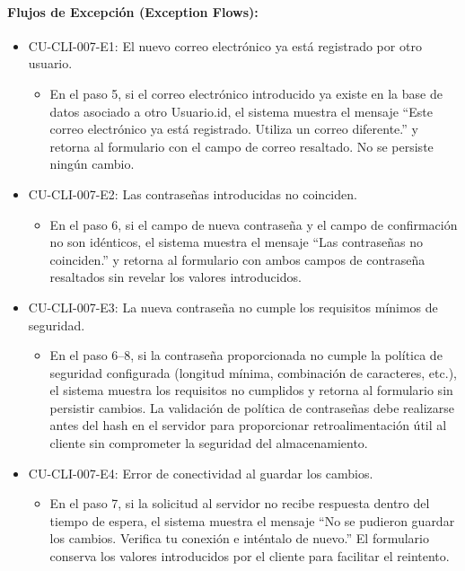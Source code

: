 \paragraph{Flujos de Excepción (Exception Flows):}
\begin{itemize}
    \item CU-CLI-007-E1: El nuevo correo electrónico ya está registrado por otro usuario.
    \begin{itemize}
        \item En el paso 5, si el correo electrónico introducido ya existe en la base de datos asociado a otro Usuario.id, el sistema muestra el mensaje ``Este correo electrónico ya está registrado. Utiliza un correo diferente.'' y retorna al formulario con el campo de correo resaltado. No se persiste ningún cambio.
    \end{itemize}
    \item CU-CLI-007-E2: Las contraseñas introducidas no coinciden.
    \begin{itemize}
        \item En el paso 6, si el campo de nueva contraseña y el campo de confirmación no son idénticos, el sistema muestra el mensaje ``Las contraseñas no coinciden.'' y retorna al formulario con ambos campos de contraseña resaltados sin revelar los valores introducidos.
    \end{itemize}
    \item CU-CLI-007-E3: La nueva contraseña no cumple los requisitos mínimos de seguridad.
    \begin{itemize}
        \item En el paso 6--8, si la contraseña proporcionada no cumple la política de seguridad configurada (longitud mínima, combinación de caracteres, etc.), el sistema muestra los requisitos no cumplidos y retorna al formulario sin persistir cambios. La validación de política de contraseñas debe realizarse antes del hash en el servidor para proporcionar retroalimentación útil al cliente sin comprometer la seguridad del almacenamiento.
    \end{itemize}
    \item CU-CLI-007-E4: Error de conectividad al guardar los cambios.
    \begin{itemize}
        \item En el paso 7, si la solicitud al servidor no recibe respuesta dentro del tiempo de espera, el sistema muestra el mensaje ``No se pudieron guardar los cambios. Verifica tu conexión e inténtalo de nuevo.'' El formulario conserva los valores introducidos por el cliente para facilitar el reintento.
    \end{itemize}
\end{itemize}

